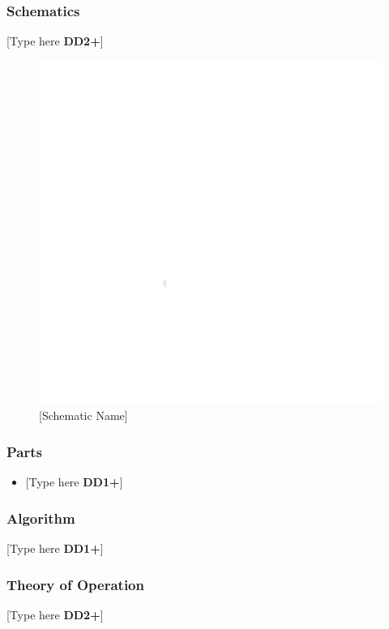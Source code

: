 \documentclass[letterpaper, 11pt]{article}
\begin{document}
\subsubsection{Schematics}
[Type here \textbf{DD2+}]
\begin{figure}[h]
    \centering
    \includegraphics[width=16cm]{images/white.png} %
    \caption{[Schematic Name]}
\end{figure} %

\subsubsection{Parts}
\begin{itemize}
    \item {[Type here \textbf{DD1+}]}
\end{itemize}

\subsubsection{Algorithm}
[Type here \textbf{DD1+}]

\subsubsection{Theory of Operation}
[Type here \textbf{DD2+}]
\end{document}
